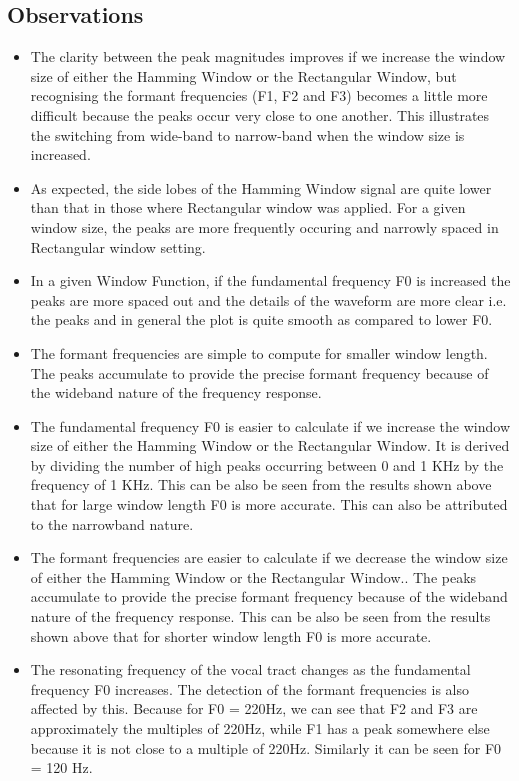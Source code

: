 \documentclass{article}
\begin{document}
\subsection{Observations}

\begin{itemize}
\item The clarity between the peak magnitudes improves if we increase the window size of either the Hamming Window or the Rectangular Window, but recognising the formant frequencies (F1, F2 and F3) becomes a little more difficult because the peaks occur very close to one another. This illustrates the switching from wide-band to narrow-band when the window size is increased.

\item As expected, the side lobes of the Hamming Window signal are quite lower than that in those where Rectangular window was applied. For a given window size, the peaks are more frequently occuring and narrowly spaced in Rectangular window setting.

\item In a given Window Function, if the fundamental frequency F0 is increased the peaks are more spaced out and the details of the waveform are more clear i.e. the peaks and in general the plot is quite smooth as compared to lower F0. 

\item The formant frequencies are simple to compute for smaller window length. The peaks accumulate to provide the precise formant frequency because of the wideband nature of the frequency response.

\item The fundamental frequency F0 is easier to calculate if we increase the window size of either the Hamming Window or the Rectangular Window. It is derived by dividing the number of high peaks occurring between 0 and 1 KHz by the frequency of 1 KHz. This can be also be seen from the results shown above that for large window length F0 is more accurate. This can also be attributed to the narrowband nature.

\item The formant frequencies are easier to calculate if we decrease the window size of either the Hamming Window or the Rectangular Window.. The peaks accumulate to provide the precise formant frequency because of the wideband nature of the frequency response. This can be also be seen from the results shown above that for shorter window length F0 is more accurate.

\item The resonating frequency of the vocal tract changes as the fundamental frequency F0 increases. The detection of the formant frequencies is also affected by this. Because for F0 = 220Hz, we can see that F2 and F3 are approximately the multiples of 220Hz, while F1 has a peak somewhere else because it is not close to a multiple of 220Hz. Similarly it can be seen for F0 = 120 Hz.

\end{itemize}
\end{document}
